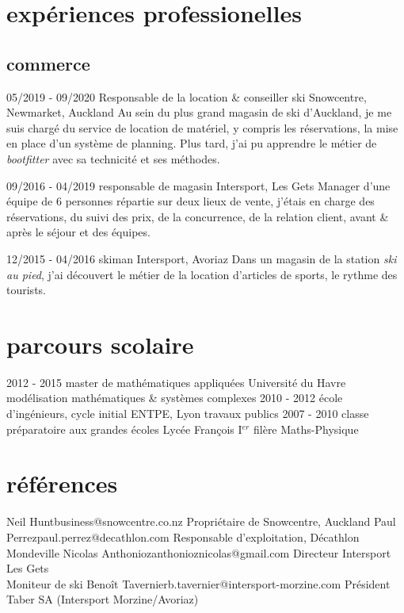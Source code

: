 \documentclass[]{farangoth-cv}
\begin{document}
\section{expériences professionelles}
\subsection{commerce}
\begin{entrylist}
  \entry%
  {05/2019 \-- 09/2020}
  {Responsable de la location \& conseiller ski}
  {Snowcentre, Newmarket, Auckland}
  {
    Au sein du plus grand magasin de ski d'Auckland, je me suis chargé du service de location de matériel, y compris les réservations, la mise en place d'un système de planning. Plus tard, j'ai pu apprendre le métier de \emph{bootfitter} avec sa technicité et ses méthodes.
  }
  
  \entry%
  {09/2016 \-- 04/2019}
  {responsable de magasin}
  {Intersport, Les Gets}
  {
    Manager d'une équipe de 6 personnes répartie sur deux lieux de vente, j'étais en charge des réservations, du suivi des prix, de la concurrence, de la relation client, avant \& après le séjour et des équipes.
  }

  \entry%
  {12/2015 \-- 04/2016}
  {skiman}
  {Intersport, Avoriaz}
  {
    Dans un magasin de la station \emph{ski au pied}, j'ai découvert le métier de la location d'articles de sports, le rythme des tourists.
  }
\end{entrylist}

\section{parcours scolaire}
\begin{entrylist}
  \entry%
  {2012 \-- 2015}
  {master de mathématiques appliquées}
  {Université du Havre}
  {
    modélisation mathématiques \& systèmes complexes
  }
  \entry%
  {2010 \-- 2012}
  {école d'ingénieurs, cycle initial}
  {ENTPE, Lyon}
  {
    travaux publics
  }
  \entry%
  {2007 \-- 2010}
  {classe préparatoire aux grandes écoles}
  {Lycée François I$^{er}$}
  {
    filère Maths\--Physique
  }
\end{entrylist}

\section{références}
\begin{entrylist}
  \doubleentryref%
  {Neil Hunt}{business@snowcentre.co.nz}
  {
    Propriétaire de Snowcentre, Auckland 
  }
  {Paul Perrez}{paul.perrez@decathlon.com}
  {
    Responsable d'exploitation, Décathlon Mondeville
  }
  \doubleentryref%
  {Nicolas Anthonioz}{anthonioznicolas@gmail.com}
  {
    Directeur Intersport Les Gets\\
    Moniteur de ski
  }
  {Benoît Tavernier}{b.tavernier@intersport-morzine.com}%
  {
    Président Taber SA (Intersport Morzine/Avoriaz) 
  }
\end{entrylist}
\end{document}
